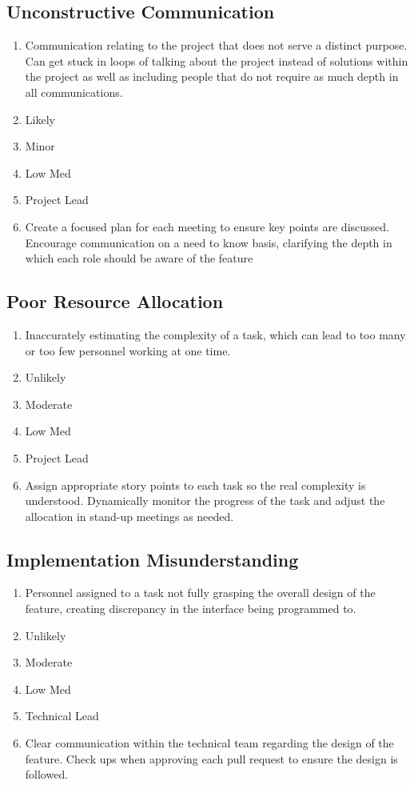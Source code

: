 \documentclass[]{report}
\begin{document}
	\subsection*{Unconstructive Communication}
	\begin{enumerate}
		\item Communication relating to the project that does not serve a distinct purpose. Can get stuck in loops of talking about the project instead of solutions within the project as well as including people that do not require as much depth in all communications.
		\item Likely
		\item Minor
		\item Low Med
		\item Project Lead
		\item Create a focused plan for each meeting to ensure key points are discussed. Encourage communication on a need to know basis, clarifying the depth in which each role should be aware of the feature
	\end{enumerate}
	\subsection*{Poor Resource Allocation}
	\begin{enumerate}
		\item Inaccurately estimating the complexity of a task, which can lead to too many or too few personnel working at one time.
		\item Unlikely
		\item Moderate
		\item Low Med
		\item Project Lead
		\item Assign appropriate story points to each task so the real complexity is understood. Dynamically monitor the progress of the task and adjust the allocation in stand-up meetings as needed.
	\end{enumerate}
	\subsection*{Implementation Misunderstanding}
	\begin{enumerate}
		\item Personnel assigned to a task not fully grasping the overall design of the feature, creating discrepancy in the interface being programmed to.
		\item Unlikely
		\item Moderate
		\item Low Med
		\item Technical Lead
		\item Clear communication within the technical team regarding the design of the feature. Check ups when approving each pull request to ensure the design is followed.
	\end{enumerate}
\end{document}
